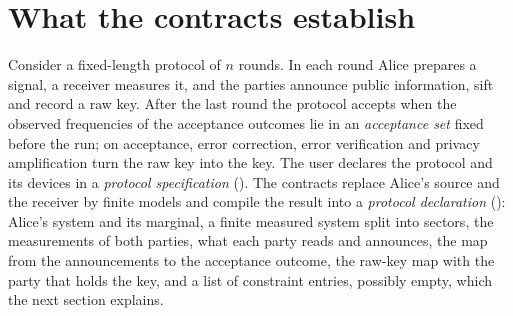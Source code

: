 \section*{What the contracts establish}

Consider a fixed-length protocol of $n$ rounds. In each round Alice prepares
a signal, a receiver measures it, and the parties announce public
information, sift and record a raw key. After the last round the protocol
accepts when the observed frequencies of the acceptance outcomes lie in an
\emph{acceptance set} fixed before the run; on acceptance, error correction,
error verification and privacy amplification turn the raw key into the key.
The user declares the protocol and its devices in a \emph{protocol
specification} (). The contracts replace
Alice's source and the receiver by finite models and compile the result into
a \emph{protocol declaration} ():
Alice's system and its marginal, a finite measured system split into sectors,
the measurements of both parties, what each party reads and announces, the
map from the announcements to the acceptance outcome, the raw-key map with
the party that holds the key, and a list of constraint entries, possibly
empty, which the next section explains.

